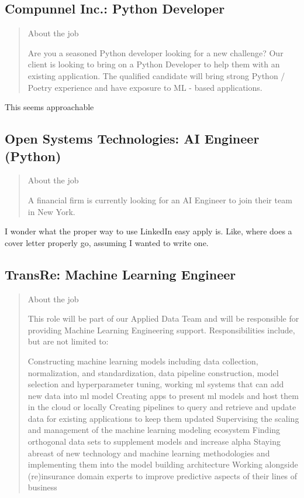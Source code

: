 \documentclass[
	letterpaper, %
	12pt, %
]{CSSullivanBusinessReport}
\begin{document}

\subsection[Compunnel Inc.]{Compunnel Inc.: Python Developer}

\begin{quote}
	About the job
	
	Are you a seasoned Python developer looking for a new challenge?
	Our client is looking to bring on a Python Developer to help them with an existing application.
	The qualified candidate will bring strong Python / Poetry experience and have exposure to ML - based applications.

\end{quote}

This seems approachable 


\subsection[Open Systems Technologies]{Open Systems Technologies: AI Engineer (Python)}

\begin{quote}
	About the job
	
	A financial firm is currently looking for an AI Engineer to join their team in New York. 

\end{quote}

I wonder what the proper way to use LinkedIn easy apply is. Like, where does a cover letter properly go, assuming I wanted to write one.  


\subsection[TransRe]{TransRe: Machine Learning Engineer}

\begin{quote}
	About the job
	
	This role will be part of our Applied Data Team and will be responsible for providing Machine Learning Engineering support. Responsibilities include, but are not limited to:

    Constructing machine learning models including data collection, normalization, and standardization, data pipeline construction, model selection and hyperparameter tuning, working ml systems that can add new data into ml model
    Creating apps to present ml models and host them in the cloud or locally
    Creating pipelines to query and retrieve and update data for existing applications to keep them updated
    Supervising the scaling and management of the machine learning modeling ecosystem
    Finding orthogonal data sets to supplement models and increase alpha
    Staying abreast of new technology and machine learning methodologies and implementing them into the model building architecture
    Working alongside (re)insurance domain experts to improve predictive aspects of their lines of business

\end{quote}
\end{document}
